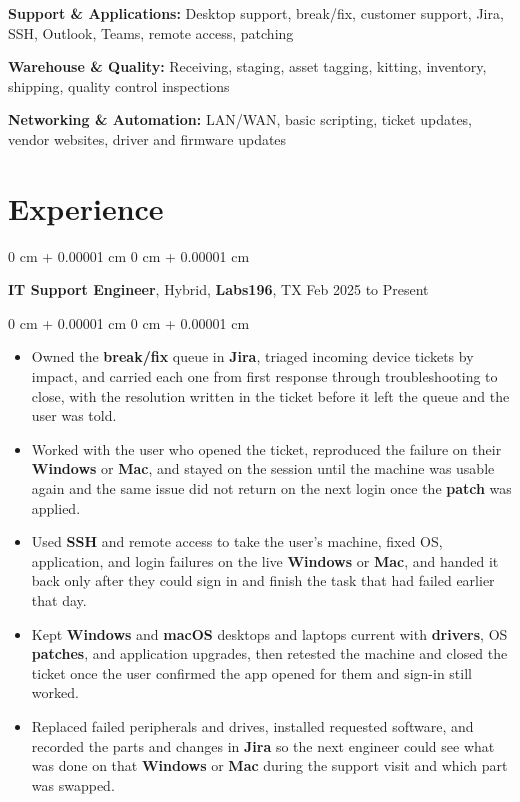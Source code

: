 \documentclass[10pt, letterpaper]{article}
\newenvironment{highlights}{
    \begin{itemize}[
        topsep=0.05 cm,
        parsep=0.03 cm,
        partopsep=0pt,
        itemsep=0.04 cm,
        leftmargin=0 cm + 10pt
    ]
}{
    \end{itemize}
} %
\newenvironment{onecolentry}{
    \begin{adjustwidth}{
        0 cm + 0.00001 cm
    }{
        0 cm + 0.00001 cm
    }
}{
    \end{adjustwidth}
} %
\newcommand{\resumeheading}[2]{%
    \begin{onecolentry}
        #1 \hfill #2
    \end{onecolentry}
} %
\begin{document}
\vspace{0.16em}

\textbf{Support \& Applications:}
Desktop support, break/fix, customer support, Jira, SSH, Outlook, Teams, remote access, patching

\vspace{0.16em}

\textbf{Warehouse \& Quality:}
Receiving, staging, asset tagging, kitting, inventory, shipping, quality control inspections

\vspace{0.16em}

\textbf{Networking \& Automation:}
LAN/WAN, basic scripting, ticket updates, vendor websites, driver and firmware updates



\vspace{0.12 cm}

\section{Experience}

\resumeheading{\textbf{IT Support Engineer}, Hybrid, \textbf{Labs196}, TX}{Feb 2025 to Present}

\begin{onecolentry}
\begin{highlights}
	\item Owned the \textbf{break/fix} queue in \textbf{Jira}, triaged incoming device tickets by impact, and carried each one from first response through troubleshooting to close, with the resolution written in the ticket before it left the queue and the user was told.
	\item Worked with the user who opened the ticket, reproduced the failure on their \textbf{Windows} or \textbf{Mac}, and stayed on the session until the machine was usable again and the same issue did not return on the next login once the \textbf{patch} was applied.
	\item Used \textbf{SSH} and remote access to take the user's machine, fixed OS, application, and login failures on the live \textbf{Windows} or \textbf{Mac}, and handed it back only after they could sign in and finish the task that had failed earlier that day.
	\item Kept \textbf{Windows} and \textbf{macOS} desktops and laptops current with \textbf{drivers}, OS \textbf{patches}, and application upgrades, then retested the machine and closed the ticket once the user confirmed the app opened for them and sign-in still worked.
	\item Replaced failed peripherals and drives, installed requested software, and recorded the parts and changes in \textbf{Jira} so the next engineer could see what was done on that \textbf{Windows} or \textbf{Mac} during the support visit and which part was swapped.
\end{highlights}
\end{onecolentry}
\end{document}
